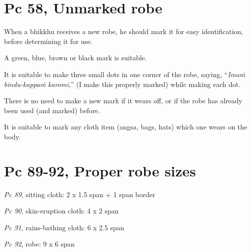 \section{Pc 58, Unmarked robe}

When a bhikkhu receives a new robe, he should mark it for easy
identification, before determining it for use.

A green, blue, brown or black mark is suitable.

It is suitable to make three small dots in one corner of the robe,
saying, ``\emph{Imaṁ bindu-kappaṁ karomi},'' (I make this properly
marked) while making each dot.

There is no need to make a new mark if it wears off, or if the robe has
already been used (and marked) before.

It is suitable to mark any cloth item (angsa, bags, hats) which one
wears on the body.

\section{Pc 89-92, Proper robe sizes}

\emph{Pc 89}, sitting cloth: 2 x 1.5 span + 1 span border

\emph{Pc 90}, skin-eruption cloth: 4 x 2 span

\emph{Pc 91}, rains-bathing cloth: 6 x 2.5 span

\emph{Pc 92}, robe: 9 x 6 span

